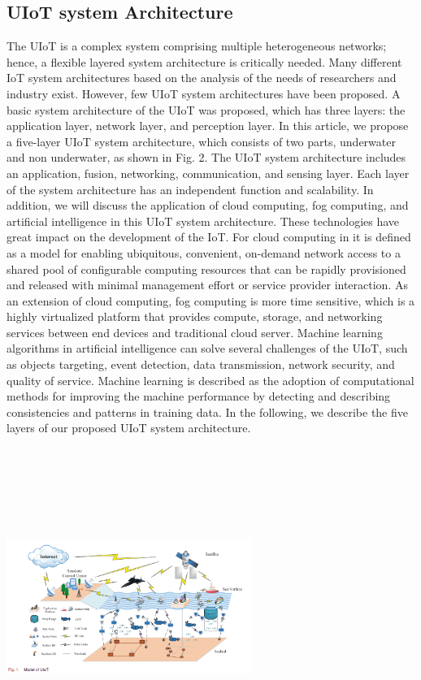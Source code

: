 \documentclass[a4paper,12pt]{article}
\begin{document}
\begin{multicols}{2}
\section{UIoT system Architecture}
The UIoT is a complex system comprising multiple heterogeneous networks; hence, a flexible layered system architecture is critically needed. Many different IoT system architectures based on the analysis of the needs of researchers and industry exist. However, few UIoT system architectures have been proposed. A basic system architecture of the UIoT was proposed, which has three layers: the application layer, network layer, and perception layer. In this article, we propose a five-layer UIoT system architecture, which consists of two parts, underwater and non underwater, as shown in Fig. 2. The UIoT system architecture includes an application, fusion, networking, communication, and sensing layer. Each layer of the system architecture has an independent function and scalability. In addition, we will discuss the application of cloud computing, fog computing, and artificial intelligence in this UIoT system architecture. These technologies have great impact on the development of the IoT. For cloud computing in it is defined as a model for enabling ubiquitous, convenient, on-demand network access to a shared pool of configurable computing resources that can be rapidly provisioned and released with minimal management effort or service provider interaction. As an extension of cloud computing, fog computing is more time sensitive, which is a highly virtualized platform that provides compute, storage, and networking services between end devices and traditional cloud server. Machine learning algorithms in artificial intelligence can solve several challenges of the UIoT, such as objects targeting, event detection, data transmission, network security, and quality of service. Machine learning is described as the adoption of computational methods for improving the machine performance by detecting and describing consistencies and patterns in training data. In the following, we describe the five layers of our proposed UIoT system architecture.\\
\\
\includegraphics[width=8cm,height=10cm,keepaspectratio]{fig1.png}

\end{multicols}
\end{document}
